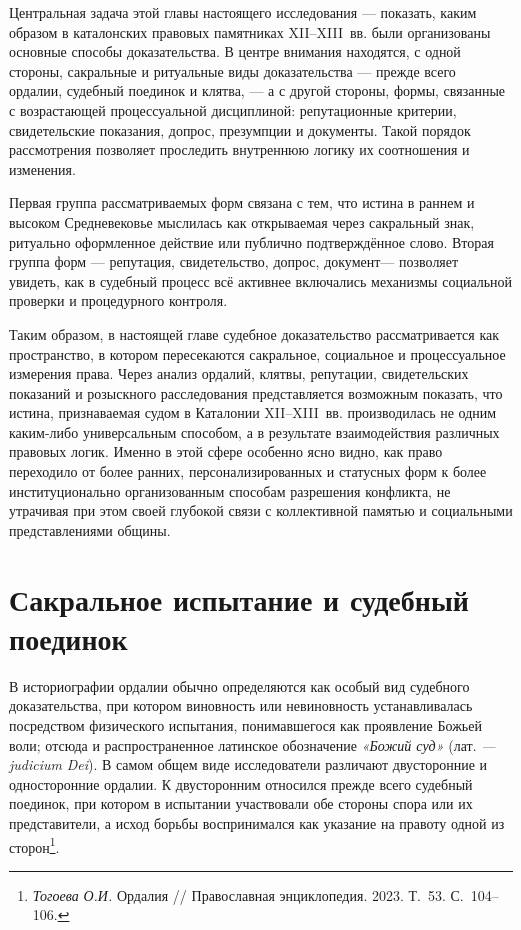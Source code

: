Центральная задача этой главы настоящего исследования --- показать, каким образом в каталонских правовых памятниках XII--XIII~вв. были организованы основные способы доказательства. В центре внимания находятся, с одной стороны, сакральные и ритуальные виды доказательства --- прежде всего ордалии, судебный поединок и клятва, --- а с другой стороны, формы, связанные с возрастающей процессуальной дисциплиной: репутационные критерии, свидетельские показания, допрос, презумпции и документы. Такой порядок рассмотрения позволяет проследить внутреннюю логику их соотношения и изменения.

Первая группа рассматриваемых форм связана с тем, что истина в раннем и высоком Средневековье мыслилась как открываемая через сакральный знак, ритуально оформленное действие или публично подтверждённое слово. Вторая группа форм --- репутация, свидетельство, допрос, документ--- позволяет увидеть, как в судебный процесс всё активнее включались механизмы социальной проверки и процедурного контроля.

Таким образом, в настоящей главе судебное доказательство рассматривается как пространство, в котором пересекаются сакральное, социальное и процессуальное измерения права. Через анализ ордалий, клятвы, репутации, свидетельских показаний и розыскного расследования представляется возможным показать, что истина, признаваемая судом в Каталонии XII--XIII~вв. производилась не одним каким-либо универсальным способом, а в результате взаимодействия различных правовых логик. Именно в этой сфере особенно ясно видно, как право переходило от более ранних, персонализированных и статусных форм к более институционально организованным способам разрешения конфликта, не утрачивая при этом своей глубокой связи с коллективной памятью и социальными представлениями общины.

\section{Сакральное испытание и судебный поединок}

В историографии ордалии обычно определяются как особый вид судебного доказательства, при котором виновность или невиновность устанавливалась посредством физического испытания, понимавшегося как проявление Божьей воли; отсюда и распространенное латинское обозначение \emph{«Божий суд»} (лат. \emph{--- }\emph{judicium}\emph{ Dei}). В самом общем виде исследователи различают двусторонние и односторонние ордалии. К двусторонним относился прежде всего судебный поединок, при котором в испытании участвовали обе стороны спора или их представители, а исход борьбы воспринимался как указание на правоту одной из сторон\footnote{\emph{Тогоева}\emph{ О.И. }Ордалия // Православная энциклопедия. 2023. Т.~53. С.~104--106.}.

